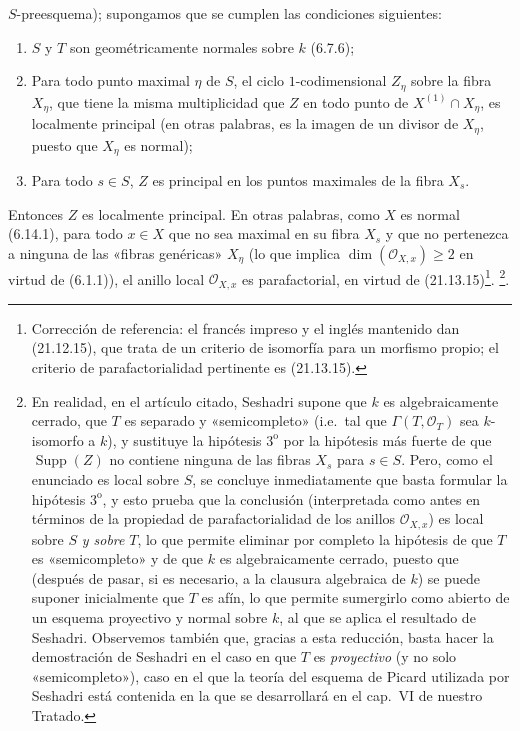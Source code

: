 \begin{env}[21.14.4]
$S$-preesquema); supongamos que se cumplen las condiciones siguientes:
\begin{enumerate}[label=\arabic*\textsuperscript{o}]
  \item $S$ y $T$ son geométricamente normales sobre $k$ (6.7.6);
  \item Para todo punto maximal $\eta$ de $S$, el ciclo $1$-codimensional $Z_\eta$
  sobre la fibra $X_\eta$, que tiene la misma multiplicidad que $Z$ en todo punto de
  $X^{(1)}\cap X_\eta$, es localmente principal (en otras palabras, es la imagen de un
  divisor de $X_\eta$, puesto que $X_\eta$ es normal);
  \item Para todo $s\in S$, $Z$ es principal en los puntos maximales de la fibra $X_s$.
\end{enumerate}
Entonces $Z$ es localmente principal. En otras palabras, como $X$ es normal (6.14.1),
para todo $x\in X$ que no sea maximal en su fibra $X_s$ y que no pertenezca a
ninguna de las «fibras genéricas» $X_\eta$ (lo que implica
$\dim(\mathcal O_{X,x})\geq2$ en virtud de (6.1.1)), el anillo local
$\mathcal O_{X,x}$ es parafactorial, en virtud de (21.13.15)\footnote{Corrección de referencia: el francés impreso y el inglés mantenido dan (21.12.15), que trata de un criterio de isomorfía para un morfismo propio; el criterio de parafactorialidad pertinente es (21.13.15).}.
\footnote{En realidad, en el artículo citado, Seshadri supone que $k$ es algebraicamente
cerrado, que $T$ es separado y «semicompleto» (i.e.\ tal que
$\Gamma(T,\mathcal O_T)$ sea $k$-isomorfo a $k$), y sustituye la hipótesis
$3^{\mathrm o}$ por la hipótesis más fuerte de que $\operatorname{Supp}(Z)$ no contiene
ninguna de las fibras $X_s$ para $s\in S$. Pero, como el enunciado es local sobre $S$, se
concluye inmediatamente que basta formular la hipótesis $3^{\mathrm o}$, y esto prueba que
la conclusión (interpretada como antes en términos de la propiedad de parafactorialidad
de los anillos $\mathcal O_{X,x}$) es local sobre $S$ \emph{y sobre} $T$, lo que permite
eliminar por completo la hipótesis de que $T$ es «semicompleto» y de que $k$ es
algebraicamente cerrado, puesto que (después de pasar, si es necesario, a la clausura algebraica de $k$)
se puede suponer inicialmente que $T$ es afín, lo que permite sumergirlo como abierto de un
esquema proyectivo y normal sobre $k$, al que se aplica el resultado de Seshadri. Observemos
también que, gracias a esta reducción, basta hacer la demostración de Seshadri en
el caso en que $T$ es \emph{proyectivo} (y no solo «semicompleto»), caso en el que la
teoría del esquema de Picard utilizada por Seshadri está contenida en la que se
desarrollará en el cap.~VI de nuestro Tratado.}.
\end{env}
